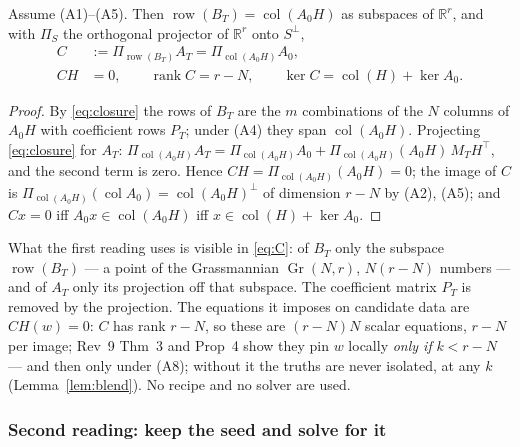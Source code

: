 \begin{theorem}\label{thm:quot}
Assume (A1)--(A5). Then $\operatorname{row}(B_T)=\operatorname{col}(A_0H)$
as subspaces of $\mathbb R^r$, and with $\Pi_S$ the orthogonal projector of
$\mathbb R^r$ onto $S^\perp$,
\begin{equation}\label{eq:C}
\begin{aligned}
  C&:=\Pi_{\operatorname{row}(B_T)}A_T=\Pi_{\operatorname{col}(A_0H)}A_0,\\
  CH&=0,\qquad \operatorname{rank}C=r-N,\qquad
  \ker C=\operatorname{col}(H)+\ker A_0 .
\end{aligned}
\end{equation}
\end{theorem}
\begin{proof}
By \eqref{eq:closure} the rows of $B_T$ are the $m$ combinations of the $N$
columns of $A_0H$ with coefficient rows $P_T$; under (A4) they span
$\operatorname{col}(A_0H)$. Projecting \eqref{eq:closure} for $A_T$:
$\Pi_{\operatorname{col}(A_0H)}A_T=\Pi_{\operatorname{col}(A_0H)}A_0+\Pi_{\operatorname{col}(A_0H)}(A_0H)\,M_TH^{\!\top}$,
and the second term is zero. Hence $CH=\Pi_{\operatorname{col}(A_0H)}(A_0H)=0$;
the image of $C$ is $\Pi_{\operatorname{col}(A_0H)}(\operatorname{col}A_0)=\operatorname{col}(A_0H)^\perp$
of dimension $r-N$ by (A2), (A5); and $Cx=0$ iff $A_0x\in\operatorname{col}(A_0H)$
iff $x\in\operatorname{col}(H)+\ker A_0$.
\end{proof}

What the first reading uses is visible in \eqref{eq:C}: of $B_T$ only the
subspace $\operatorname{row}(B_T)$ — a point of the Grassmannian
$\operatorname{Gr}(N,r)$, $N(r-N)$ numbers — and of $A_T$ only its projection
off that subspace. The coefficient matrix $P_T$ is removed by the projection.
The equations it imposes on candidate data are $CH(w)=0$: $C$ has rank $r-N$,
so these are $(r-N)N$ scalar equations, $r-N$ per image; Rev~9 Thm~3 and
Prop~4 show they pin $w$ locally \emph{only if} $k<r-N$ --- and then only
under (A8); without it the truths are never isolated, at any $k$
(Lemma~\ref{lem:blend}). No recipe and no solver are used.

\subsubsection*{Second reading: keep the seed and solve for it}


